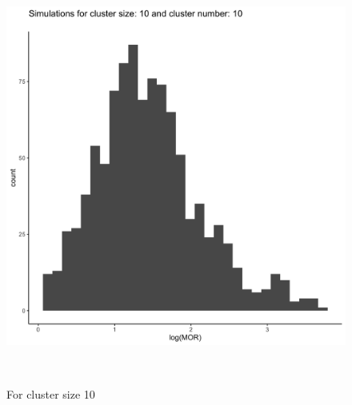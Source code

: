 \documentclass[
  letterpaper,
  DIV=11,
  numbers=noendperiod,
  titlepage]{scrartcl}
\begin{document}
\begin{figure}
\begin{minipage}[t]{0.50\linewidth}
{{\includegraphics{../plots/ran-int/hist_10_10.png}

}

\caption{For cluster size 10}

}

\end{minipage}%
\newline
\begin{minipage}[t]{\linewidth}

{\centering 

~

}

\end{minipage}%
\newline
\begin{minipage}[t]{0.50\linewidth}

{\centering 

\raisebox{-\height}{

}}
\end{minipage}
\end{figure}
\end{document}
